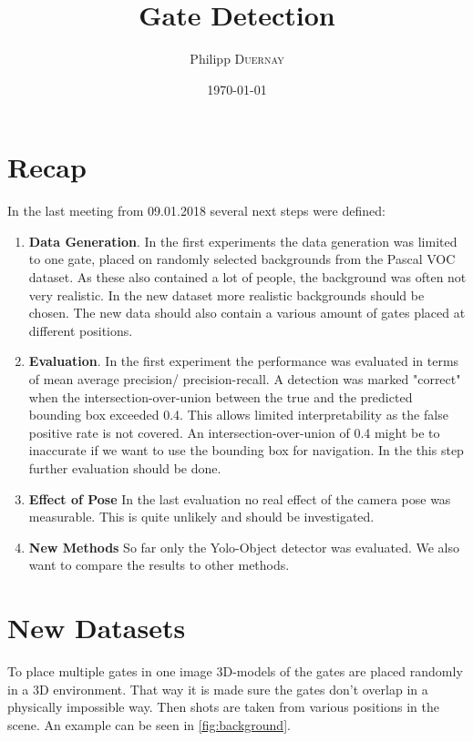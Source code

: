 \documentclass{article}
\title{Gate Detection} %
\author{Philipp \textsc{Duernay}} %
\date{\today} %
\begin{document}
\maketitle


\section{Recap}
In the last meeting from 09.01.2018 several next steps were defined:
\begin{enumerate}
	\item \textbf{Data Generation}. In the first experiments the data generation was limited to one gate, placed on randomly selected backgrounds from the Pascal VOC dataset. As these also contained a lot of people, the background was often not very realistic. In the new dataset more realistic backgrounds should be chosen. The new data should also contain a various amount of gates placed at different positions.
	\item \textbf{Evaluation}. In the first experiment the performance was evaluated in terms of mean average precision/ precision-recall. A detection was marked "correct" when the intersection-over-union between the true and the predicted bounding box exceeded 0.4. This allows limited interpretability as the false positive rate is not covered. An intersection-over-union of 0.4 might be to inaccurate if we want to use the bounding box for navigation. In the this step further evaluation should be done.
	\item \textbf{Effect of Pose} In the last evaluation no real effect of the camera pose was measurable. This is quite unlikely and should be investigated.
	\item \textbf{New Methods} So far only the Yolo-Object\cite{Redmon} detector was evaluated. We also want to compare the results to other methods.
\end{enumerate}

\section{New Datasets}
To place multiple gates in one image 3D-models of the gates are placed randomly in a 3D environment. That way it is made sure the gates don't overlap in a physically impossible way. Then shots are taken from various positions in the scene. An example can be seen in \autoref{fig:background}.
\end{document}
